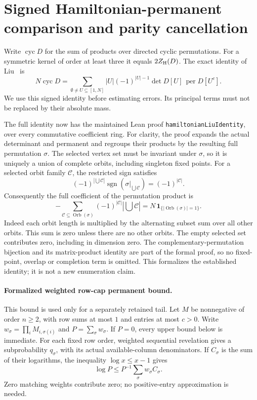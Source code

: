 \section{Signed Hamiltonian-permanent comparison and parity cancellation}
\label{sec:relativehamilton}
Write \(\operatorname{cyc}D\) for the sum of products over
directed cyclic permutations. For a symmetric kernel of order
at least three it equals \(2Z_{\rm H}(D)\).
The exact identity of Liu~\cite{Liu} is
\[
 N\operatorname{cyc}D
 =\sum_{\emptyset\ne U\subseteq[1,N]}
       |U|(-1)^{|U|-1}\det D[U]\,
                                  \operatorname{per}D[U^c].
\]
We use this signed identity before estimating errors.
Its principal terms must not be replaced by their absolute mass.

The full identity now has the maintained Lean proof
\texttt{hamiltonianLiuIdentity}, over every commutative coefficient ring.
For clarity, the proof expands the actual determinant and permanent and
regroups their products by the resulting full permutation \(\sigma\).
The selected vertex set must be invariant under \(\sigma\), so it is
uniquely a union of complete orbits, including singleton fixed points.
For a selected orbit family \(\mathcal C\), the restricted sign satisfies
\[
 (-1)^{|\bigcup\mathcal C|}
       \operatorname{sgn}(\sigma|_{\bigcup\mathcal C})
                         =(-1)^{|\mathcal C|}.
\]
Consequently the full coefficient of the permutation product is
\[
 -\sum_{\mathcal C\subseteq\operatorname{Orb}(\sigma)}
       (-1)^{|\mathcal C|}|\bigcup\mathcal C|
 =N\,\mathbf1_{\{|\operatorname{Orb}(\sigma)|=1\}}.
\]
Indeed each orbit length is multiplied by the alternating subset sum
over all other orbits. This sum is zero unless there are no other
orbits. The empty selected set contributes zero, including in
dimension zero. The complementary-permutation bijection and its
matrix-product identity are part of the formal proof, so no fixed-point,
overlap or completion term is omitted. This formalizes the established
identity; it is not a new enumeration claim.

\paragraph{Formalized weighted row-cap permanent bound.}
This bound is used only for a separately retained tail.
Let \(M\) be nonnegative of order \(n\geq2\), with row sums at
most \(1\) and entries at most \(c>0\).
Write \(w_\sigma=\prod_iM_{i,\sigma(i)}\) and
\(P=\sum_\sigma w_\sigma\).
If \(P=0\), every upper bound below is immediate.
For each fixed row order, weighted sequential revelation gives
a subprobability \(q_\sigma\), with its actual available-column
denominators. If \(C_\sigma\) is the sum of their logarithms,
the inequality \(\log x\leq x-1\) gives
\[
 \log P\leq P^{-1}\sum_\sigma w_\sigma C_\sigma.
\]
Zero matching weights contribute zero; no positive-entry
approximation is needed.

